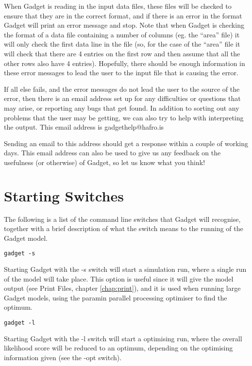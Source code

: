 \documentclass[]{book}
\begin{document}
When Gadget is reading in the input data files, these files will be
checked to ensure that they are in the correct format, and if there is
an error in the format Gadget will print an error message and stop. Note
that when Gadget is checking the format of a data file containing a
number of columns (eg. the ``area'' file) it will only check the first
data line in the file (so, for the case of the ``area'' file it will check
that there are 4 entries on the first row and then assume that all the
other rows also have 4 entries). Hopefully, there should be enough
information in these error messages to lead the user to the input file
that is causing the error.

If all else fails, and the error messages do not lead the user to the
source of the error, then there is an email address set up for any
difficulties or questions that may arise, or reporting any bugs that get
found. In addition to sorting out any problems that the user may be
getting, we can also try to help with interpreting the output. This
email address is gadgethelp@hafro.is

Sending an email to this address should get a response within a couple
of working days. This email address can also be used to give us any
feedback on the usefulness (or otherwise) of Gadget, so let us know what
you think!

\hypertarget{sec:starting}{%
\section{Starting Switches}\label{sec:starting}}

The following is a list of the command line switches that Gadget will
recognise, together with a brief description of what the switch means to
the running of the Gadget model.

\begin{verbatim}
gadget -s
\end{verbatim}

Starting Gadget with the -s switch will start a simulation run, where a
single run of the model will take place. This option is useful since it
will give the model output (see Print Files,
chapter \ref{chap:print}),
and it is used when running large Gadget models, using the paramin
parallel processing optimiser to find the optimum.

\begin{verbatim}
gadget -l
\end{verbatim}

Starting Gadget with the -l switch will start a optimising run, where
the overall likelihood score will be reduced to an optimum, depending on
the optimising information given (see the -opt switch).
\end{document}
